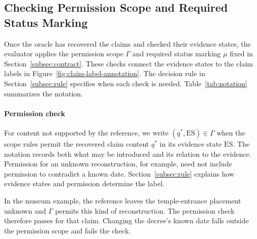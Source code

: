 \documentclass{clv2025}
\begin{document}
\subsection{Checking Permission Scope and Required Status Marking}\label{subsec:contract-checks}

Once the oracle has recovered the claims and checked their evidence
states, the evaluator applies the permission scope $\Gamma$ and required
status marking $\mu$ fixed in Section~\ref{subsec:contract}. These checks
connect the evidence states to the claim labels in
Figure~\ref{fig:claim-label-annotation}. The decision rule in
Section~\ref{subsec:rule} specifies when each check is needed.
Table~\ref{tab:notation} summarizes the notation.



\paragraph{Permission check}
For content not supported by the reference, we write
$(q^*,\mathrm{ES})\in\Gamma$ when the scope rules permit the recovered claim
content $q^*$ in its evidence state $\mathrm{ES}$. The notation records both
what may be introduced and its relation to the evidence. Permission for an
unknown reconstruction, for example, need not include permission to
contradict a known date. Section~\ref{subsec:rule} explains how evidence states
and permission determine the label.

In the museum example, the reference leaves the temple-entrance placement
unknown and $\Gamma$ permits this kind of reconstruction. The permission
check therefore passes for that claim. Changing the decree's known date
falls outside the permission scope and fails the check.
\end{document}
